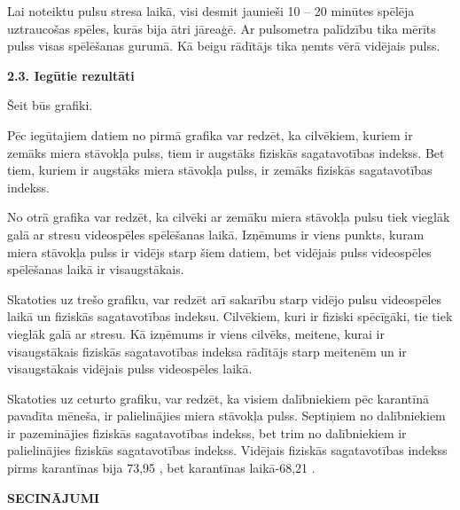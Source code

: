 \documentclass[12pt]{article}
\begin{document}
Lai noteiktu pulsu stresa laikā, visi desmit jaunieši 10 – 20 minūtes spēlēja uztraucošas spēles, kurās bija ātri jāreaģē. Ar pulsometra palīdzību tika mērīts pulss visas spēlēšanas gurumā. Kā beigu rādītājs tika ņemts vērā vidējais pulss.

\begin{center}
\fontsize{14}{}\selectfont\textbf{2.3. Iegūtie rezultāti}
\end{center}
Šeit būs grafiki.

Pēc iegūtajiem datiem no pirmā grafika var redzēt, ka cilvēkiem, kuriem ir zemāks miera stāvokļa pulss, tiem ir augstāks fiziskās sagatavotības indekss. Bet tiem, kuriem ir augstāks miera stāvokļa pulss, ir zemāks fiziskās sagatavotības indekss. \par
No otrā grafika var redzēt, ka cilvēki ar zemāku miera stāvokļa pulsu tiek vieglāk galā ar stresu videospēles spēlēšanas laikā. Izņēmums ir viens punkts, kuram miera stāvokļa pulss ir vidējs starp šiem datiem, bet vidējais pulss videospēles spēlēšanas laikā ir visaugstākais. \par
Skatoties uz trešo grafiku, var redzēt arī sakarību starp vidējo pulsu videospēles laikā un fiziskās sagatavotības indeksu. Cilvēkiem, kuri ir fiziski spēcīgāki, tie tiek vieglāk galā ar stresu. Kā izņēmums ir viens cilvēks, meitene, kurai ir visaugstākais fiziskās sagatavotības indeksa rādītājs starp meitenēm un ir visaugstākais vidējais pulss videospēles laikā. \par
Skatoties uz ceturto grafiku, var redzēt, ka visiem dalībniekiem pēc karantīnā pavadīta mēneša, ir palielinājies miera stāvokļa pulss. Septiņiem no dalībniekiem ir pazeminājies fiziskās sagatavotības indekss, bet trim no dalībniekiem ir palielinājies fiziskās sagatavotības indekss. Vidējais fiziskās sagatavotības indekss pirms karantīnas bija 73,95 , bet karantīnas laikā-68,21 .

\newpage
\begin{center}
\fontsize{14}{}\selectfont\textbf{SECINĀJUMI}
\end{center}
\end{document}
